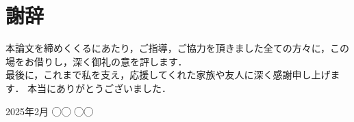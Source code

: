 \documentclass[../main]{subfiles}
\begin{document}
\chapter{謝辞}
\label{thankyou}

\thispagestyle{empty}

\newpage


本論文を締めくくるにあたり，ご指導，ご協力を頂きました全ての方々に，この場をお借りし，深く御礼の意を評します．
\\

最後に，これまで私を支え，応援してくれた家族や友人に深く感謝申し上げます．
本当にありがとうございました．

\begin{flushright}
  2025年2月 ◯◯ ◯◯
\end{flushright}

\end{document}
